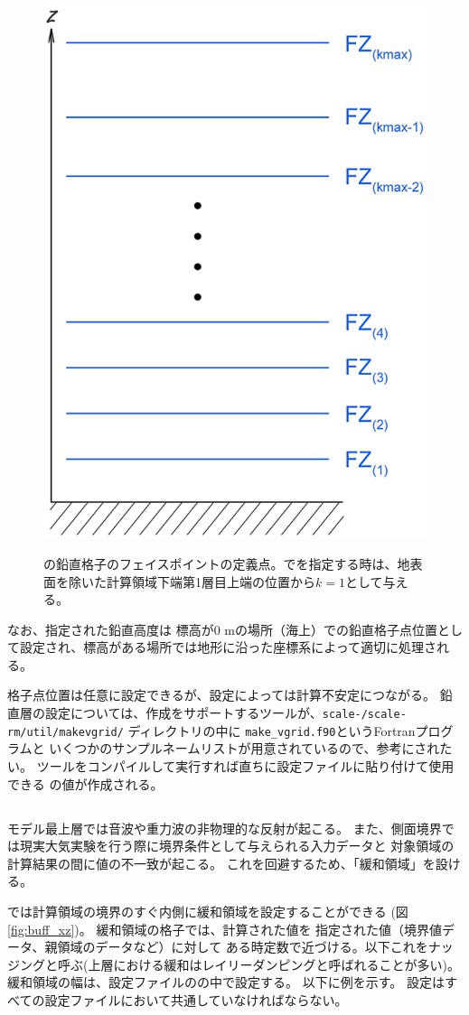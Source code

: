 \begin{figure}[tb]
\begin{center}
  \includegraphics[width=0.4\hsize]{./figure/verticalface.eps}\\
  \caption{\scalerm の鉛直格子のフェイスポイントの定義点。でを指定する時は、地表面を除いた計算領域下端第1層目上端の位置から$k=1$として与える。}
  \label{fig:scale_grid}
\end{center}
\end{figure}

なお、指定された鉛直高度は
標高が0 mの場所（海上）での鉛直格子点位置として設定され、標高がある場所では地形に沿った座標系によって適切に処理される。


格子点位置は任意に設定できるが、設定によっては計算不安定につながる。
鉛直層の設定については、作成をサポートするツールが、\texttt{scale-\version/scale-rm/util/makevgrid/}
ディレクトリの中に \verb|make_vgrid.f90|というFortranプログラムと
いくつかのサンプルネームリストが用意されているので、参考にされたい。
ツールをコンパイルして実行すれば直ちに設定ファイルに貼り付けて使用できる
の値が作成される。


\subsection{\SecBasicBufferSetting} \label{subsec:buffer}
モデル最上層では音波や重力波の非物理的な反射が起こる。
また、側面境界では現実大気実験を行う際に境界条件として与えられる入力データと
対象領域の計算結果の間に値の不一致が起こる。
これを回避するため、「緩和領域」を設ける。

\scalerm では計算領域の境界のすぐ内側に緩和領域を設定することができる
(図\ref{fig:buff_xz})。
緩和領域の格子では、計算された値を
指定された値（境界値データ、親領域のデータなど）に対して
ある時定数で近づける。以下これをナッジングと呼ぶ(上層における緩和はレイリーダンピングと呼ばれることが多い)。
緩和領域の幅は、設定ファイルのの中で設定する。
以下に例を示す。
設定はすべての設定ファイルにおいて共通していなければならない。\\

